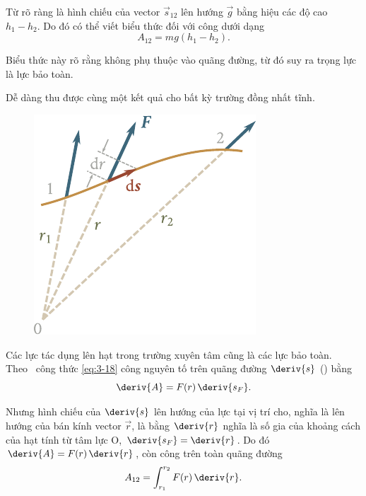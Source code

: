\noindent
Từ  rõ ràng là hình chiếu của vector $\vec{s}_{12}$ lên hướng $\vec{g}$ bằng hiệu các độ cao $h_1-h_2$. Do đó có thể viết biểu thức đối với công dưới dạng  
\begin{equation}\label{eq:3_23}
A_{12} = mg(h_1-h_2).
\end{equation}

\noindent
Biểu thức này rõ rằng không phụ thuộc vào quãng đường, từ đó suy ra trọng lực là lực bảo toàn.

Dễ dàng thu được cùng một kết quả cho bất kỳ trường đồng nhất tĩnh.

\begin{figure}[!htb]
	\begin{center}
		\includegraphics[scale=1]{figures/ch_03/fig_3_7.pdf}
		\caption[]{}
		\label{fig:3_7}
	\end{center}
\end{figure}

Các lực tác dụng lên hạt trong trường xuyên tâm cũng là các lực bảo toàn. Theo~ công thức \eqref{eq:3-18} công nguyên tố trên quãng đường $\deriv{s}$ () bằng
\begin{equation*}
\deriv{A} = F(r)\,\deriv{s_F}.
\end{equation*}

\noindent
Nhưng hình chiếu của $\deriv{s}$ lên hướng của lực tại vị trí cho, nghĩa là lên hướng của bán kính vector $\vec{r}$, là bằng $\deriv{r}$ nghĩa là số gia của khoảng cách của hạt tính từ tâm lực O, $\deriv{s_F}=\deriv{r}$. Do đó $\deriv{A}=F(r)\,\deriv{r}$, còn công trên toàn quãng đường 
\begin{equation}\label{eq:3_24}
A_{12} = \int_{r_1}^{r_2} F(r)\,\deriv{r}.
\end{equation}

